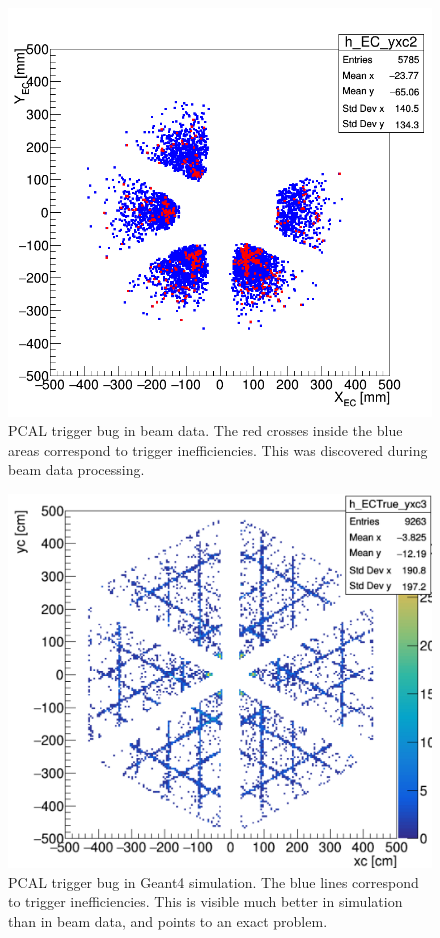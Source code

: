\begin{figure}[hbt]
	\centering
	\includegraphics[width=1.0\columnwidth,keepaspectratio]{img/PCAL_bug_data.png}
	\caption{PCAL trigger bug in beam data. The red crosses inside the blue areas correspond to trigger
          inefficiencies. This was discovered during beam data processing.}
	\label{fig:PCAL_bug_data}
\end{figure}

\begin{figure}[hbt]
	\centering
	\includegraphics[width=1.0\columnwidth,keepaspectratio]{img/PCAL_bug_hls.png}
	\caption{PCAL trigger bug in Geant4 simulation. The blue lines correspond to trigger inefficiencies. This
          is visible much better in simulation than in beam data, and points to an exact problem.}
	\label{fig:PCAL_bug_hls}
\end{figure}
